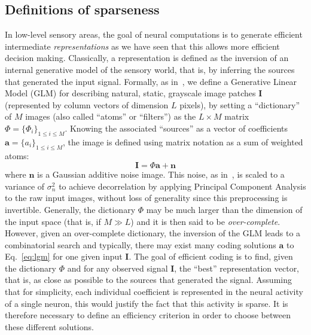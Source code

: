 \documentclass[a4paper, 11pt]{book}
\newcommand{\image}{\mathbf{I}} %
\newcommand{\dico}{\Phi} %
\newcommand{\coef}{\mathbf{a}} %
\newcommand{\seeEq}[1]{Eq.~\ref{eq:#1}}%
\begin{document}
\subsection{Definitions of sparseness}
In low-level sensory areas, the goal of neural computations is to generate efficient intermediate \emph{representations} as we have seen that this allows more efficient decision making.
Classically, a representation is defined as the inversion of an internal generative model of the sensory world,
that is, by inferring the sources that generated the input signal.
Formally, as in~\citep{Olshausen97}, we define a Generative Linear Model (GLM)
for describing natural, static, grayscale image patches $\image$ (represented by column vectors of dimension $L$ pixels),
by setting a ``dictionary'' of $M$ images (also called ``atoms'' or ``filters'') as the $L \times M$ matrix $\dico=\{ \dico_i\}_{1\leq i \leq M}$.
Knowing the associated ``sources'' as a vector of coefficients $\coef=\{ a_i \}_{1\leq i \leq M}$, the image is defined using matrix notation as a sum of weighted atoms:%
\begin{equation}%
\image = \dico\coef + \mathbf{n}%
\label{eq:lgm}%
\end{equation} %
where $\mathbf{n}$ is a Gaussian additive noise image. This noise, as in~\citep{Olshausen97}, is scaled to a variance of $\sigma_n^2$ to achieve decorrelation by applying Principal Component Analysis to the raw input images, without loss of generality since this preprocessing is invertible. Generally, the dictionary $\dico$ may be much larger than the dimension of the input space (that is, if $M \gg L$) and it is then said to be \emph{over-complete}. However, given an over-complete dictionary, the inversion of the GLM leads to a combinatorial search and typically, there may exist many coding solutions $\coef$ to \seeEq{lgm} for one given input $\image$. The goal of efficient coding is to find, given the dictionary $\dico$ and for any observed signal $\image$, the ``best'' representation vector, that is, as close as possible to the sources that generated the signal. Assuming that for simplicity, each individual coefficient is represented in the neural activity of a single neuron, this would justify the fact that this activity is sparse. It is therefore necessary to define an efficiency criterion in order to choose between these different solutions. %
\end{document}
